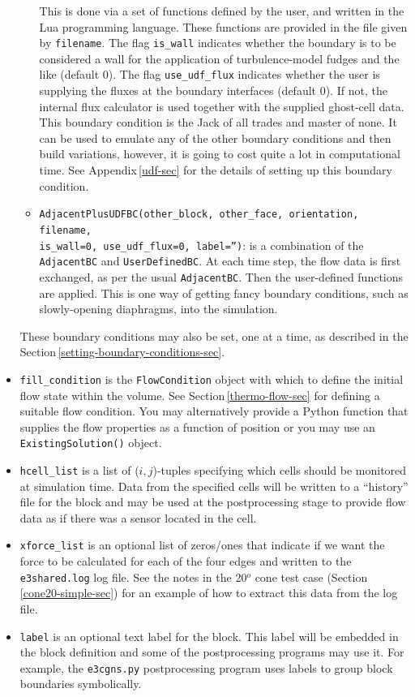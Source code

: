 \documentclass[12pt,a4paper,twoside]{article}
\begin{document}
\begin{itemize}
\begin{itemize}
       This is done via a set of functions defined by the user, and written in the Lua
       programming language.
       These functions are provided in the file given by \texttt{filename}.
       The flag \texttt{is\_wall} indicates whether the boundary is to be considered
       a wall for the application of turbulence-model fudges and the like (default 0).
       The flag \texttt{use\_udf\_flux} indicates whether the user is supplying
       the fluxes at the boundary interfaces (default 0).  
       If not, the internal flux calculator is used together with the supplied ghost-cell data.
       This boundary condition is the Jack of all trades and master of none.
       It can be used to emulate any of the other boundary conditions and then build
       variations, however, it is going to cost quite a lot in computational time.
       See Appendix\,\ref{udf-sec} for the details of setting up this boundary condition.
    \item \texttt{AdjacentPlusUDFBC(other\_block, other\_face, orientation, filename, \\is\_wall=0, use\_udf\_flux=0, label='')}: 
       is a combination of the \texttt{AdjacentBC} and \texttt{UserDefinedBC}.
       At each time step, the flow data is first exchanged, as per the usual
       \texttt{AdjacentBC}.  Then the user-defined functions are applied.
       This is one way of getting fancy boundary conditions, such as slowly-opening diaphragms,
       into the simulation.
  \end{itemize}
  These boundary conditions may also be set, one at a time, as described in the 
  Section\,\ref{setting-boundary-conditions-sec}.
\item \texttt{fill\_condition} is the \texttt{FlowCondition} object with which to
  define the initial flow state within the volume.
  See Section\,\ref{thermo-flow-sec} for defining a suitable flow condition.
  You may alternatively provide a Python function that supplies the flow properties as
  a function of position or you may use an \texttt{ExistingSolution()} object.
\item \texttt{hcell\_list} is a list of ($i,j$)-tuples specifying which
  cells should be monitored at simulation time.
  Data from the specified cells will be written to a ``history'' file for the
  block and may be used at the postprocessing stage to provide flow data as if
  there was a sensor located in the cell.
\item \texttt{xforce\_list} is an optional list of zeros/ones that indicate if we
  want the force to be calculated for each of the four edges and written to the 
  \texttt{e3shared.log} log file.
  See the notes in the 20$^o$ cone test case (Section\,\ref{cone20-simple-sec}) for an
  example of how to extract this data from the log file. 
\item \texttt{label} is an optional text label for the block.  This label
  will be embedded in the block definition and some of the postprocessing
  programs may use it.
  For example, the \texttt{e3cgns.py} postprocessing program uses labels to group block boundaries symbolically.
\end{itemize}
\end{document}
